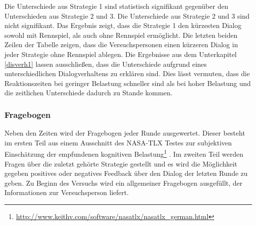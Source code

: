 \documentclass[12pt,a4paper]{scrartcl}
\begin{document}
Die Unterschiede aus Strategie 1 sind statistisch signifikant gegenüber den Unterschieden aus Strategie 2 und 3. Die Unterschiede aus Strategie 2 und 3 sind nicht signifikant. Das Ergebnis zeigt, dass die Strategie 1 den kürzesten Dialog sowohl mit Rennspiel, als auch ohne Rennspiel ermöglicht. Die letzten beiden Zeilen der Tabelle zeigen, dass die Versuchspersonen einen kürzeren Dialog in jeder Strategie ohne Rennspiel ablegen. Die Ergebnisse aus dem Unterkapitel \ref{disverh1} lassen ausschließen, dass die Unterschiede aufgrund eines unterschiedlichen Dialogverhaltens zu erklären sind. Dies lässt vermuten, dass die Reaktionszeiten bei geringer Belastung schneller sind als bei hoher Belastung und die zeitlichen Unterschiede dadurch zu Stande kommen. 
\subsubsection{Fragebogen}
\label{fragebogen1}
Neben den Zeiten wird der Fragebogen jeder Runde ausgewertet. Dieser besteht im ersten Teil aus einem Ausschnitt des NASA-TLX Testes zur subjektiven Einschätzung der empfundenen kognitiven Belastung\footnote{\label{foot:nasatlx1}\url{http://www.keithv.com/software/nasatlx/nasatlx_german.html}} . Im zweiten Teil werden Fragen über die zuletzt gehörte Strategie gestellt und es wird die Möglichkeit gegeben positives oder negatives Feedback über den Dialog der letzten Runde zu geben. Zu Beginn des Versuchs wird ein allgemeiner Fragebogen ausgefüllt, der Informationen zur Versuchsperson liefert. 
\end{document}
